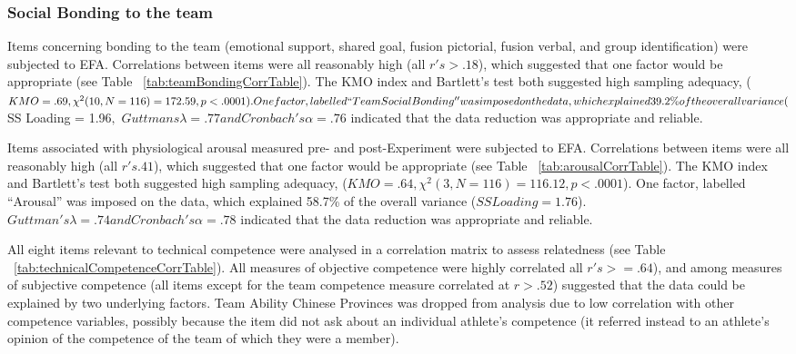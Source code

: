 \subsubsection{Social Bonding to the team \label{app6:teamBondingEFA}}
Items concerning bonding to the team (emotional support, shared goal, fusion pictorial, fusion verbal, and group identification) were subjected to EFA.  Correlations between items were all reasonably high (all $r's > .18$), which suggested that one factor would be appropriate (see Table ~\ref{tab:teamBondingCorrTable}).
The KMO index and Bartlett's test both suggested high sampling adequacy, ($KMO = .69, \chi^2(10, N = 116) = 172.59, p < .0001).
One factor, labelled ``Team Social Bonding'' was imposed on the data, which explained 39.2\% of the overall variance ($SS Loading = 1.96$, $ $Guttmans \lambda = .77 and Cronbach's \alpha = .76$ indicated that the data reduction was appropriate and reliable.

Items associated with physiological arousal measured pre- and post-Experiment were subjected to EFA.
Correlations between items were all reasonably high (all $r's  .41$), which suggested that one factor would be appropriate (see Table ~\ref{tab:arousalCorrTable}). The KMO index and Bartlett's test both suggested high sampling adequacy, ($KMO = .64, \chi^2(3, N = 116) = 116.12, p < .0001$).  One factor, labelled ``Arousal'' was imposed on the data, which explained 58.7\% of the overall variance ($SS Loading = 1.76$).  $Guttman's \lambda = .74 and  Cronbach's \alpha = .78$  indicated that the data reduction was appropriate and reliable.


All eight items relevant to technical competence were analysed in a correlation matrix to assess relatedness (see Table ~\ref{tab:technicalCompetenceCorrTable}). All measures of objective competence were highly correlated all $r's >= .64$),  and among measures of subjective competence (all items except for the team competence measure correlated at $r > .52$) suggested that the data could be explained by two underlying factors. Team Ability Chinese Provinces was dropped from analysis due to low correlation with other competence variables, possibly because the item did not ask about an individual athlete’s competence (it referred instead to an athlete’s opinion of the competence of the team of which they were a member).

